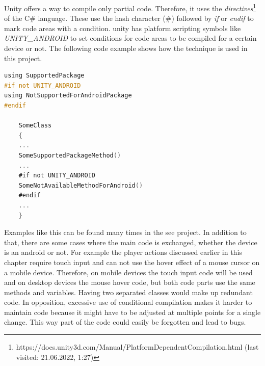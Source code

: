 Unity offers a way to compile only partial code. 
Therefore, it uses the \textit{directives}\footnote{https://docs.unity3d.com/Manual/PlatformDependentCompilation.html (last visited: 21.06.2022, 1:27)} of the C\# language. 
These use the hash character (\#) followed by \textit{if} or \textit{endif} to mark code areas with a condition.
\gls{unity} has platform scripting symbols like \textit{UNITY\_ANDROID} to set conditions for code areas to be compiled for a certain device or not.
The following code example shows how the technique is used in this project. 

\begin{minipage}{\linewidth}

\begin{lstlisting}[language=C]
using SupportedPackage
#if not UNITY_ANDROID
using NotSupportedForAndroidPackage
#endif 

    SomeClass
    {
    ...
    SomeSupportedPackageMethod()
    ...
    #if not UNITY_ANDROID
    SomeNotAvailableMethodForAndroid()
    #endif
    ...
    }
\end{lstlisting}

\end{minipage}

Examples like this can be found many times in the \gls{see} project. 
In addition to that, there are some cases where the main code is exchanged, whether the device is an \gls{android} or not.
For example the player actions discussed earlier in this chapter require touch input and can not use the hover effect of a mouse cursor on a mobile device.
Therefore, on mobile devices the touch input code will be used and on desktop devices the mouse hover code, but both code parts use the same methods and variables.
Having two separated classes would make up redundant code. 
In opposition, excessive use of conditional compilation makes it harder to maintain code because it might have to be adjusted at multiple points for a single change.
This way part of the code could easily be forgotten and lead to bugs.

